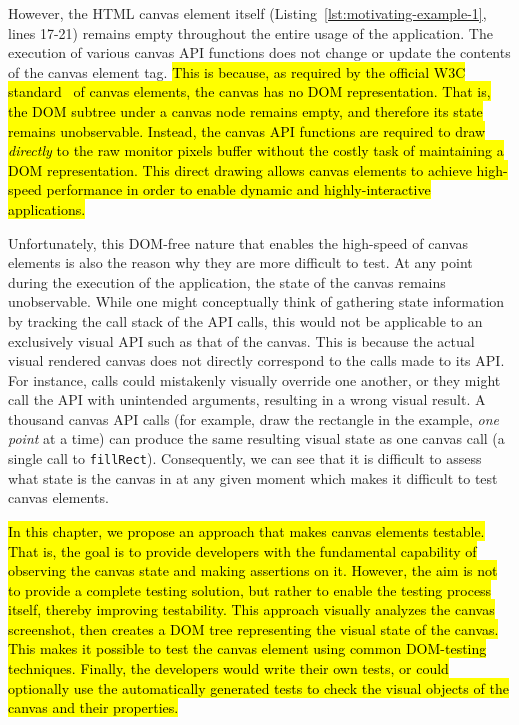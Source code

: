 However, the HTML canvas element itself (Listing~\ref{lst:motivating-example-1}, lines 17-21)  remains empty throughout the entire usage of the application.
The execution of various canvas API functions does not change or update the contents of the canvas element tag.
\hl{This is because, as required by the official W3C standard~\mbox{\cite{w3c_canvas_standard}} of canvas elements, the canvas has no DOM representation. That is, the DOM subtree under a canvas node remains empty, and therefore its state remains unobservable. 
Instead, the canvas API functions are required to draw \mbox{\emph{directly}} to the raw monitor pixels buffer without the costly task of maintaining a DOM representation. This direct drawing allows canvas elements to achieve high-speed performance in order to enable dynamic and highly-interactive applications. }

Unfortunately, this DOM-free nature that enables the high-speed of canvas elements is also the reason why they are more difficult to test.
At any point during the execution of the application, the state of the canvas remains unobservable.
While one might conceptually think of gathering state information by tracking the call stack of the API calls, this would not be applicable to an exclusively visual API such as that of the canvas.
This is because the actual visual rendered canvas does not directly correspond to the calls made to its API.
For instance, calls could mistakenly visually override one another, or they might call the API with unintended arguments, resulting in a wrong visual result. 
A thousand canvas API calls (for example, draw the rectangle in the example, \emph{one point} at a time) can produce the same resulting visual state as one canvas call (a single call to \verb|fillRect|).
Consequently, we can see that it is difficult to assess what state is the canvas in at any given moment which makes it difficult to test canvas elements.

\hl{In this chapter, we propose an approach that makes canvas elements testable. That is, the goal is to 
provide developers with the fundamental capability of observing the canvas state and making assertions on it. However, the aim is not to provide a complete testing solution, but rather to enable the 
testing process itself, thereby improving testability. This approach visually analyzes the canvas screenshot, then creates a DOM tree representing the visual state of the canvas.
This makes it possible to test the canvas element using common DOM-testing techniques.
Finally, the developers would write their own tests, or could optionally use the automatically generated tests to check the visual objects of the canvas and their properties.}


